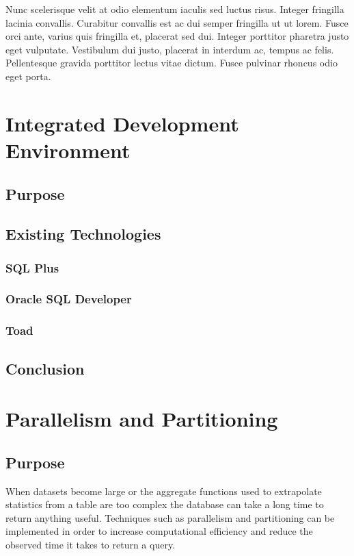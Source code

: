 \documentclass[draftclsnofoot, onecolumn, compsoc, 10pt]{IEEEtran}
\begin{document}
Nunc scelerisque velit at odio elementum iaculis sed luctus risus. Integer fringilla lacinia convallis. Curabitur convallis est ac dui semper fringilla ut ut lorem. Fusce orci ante, varius quis fringilla et, placerat sed dui. Integer porttitor pharetra justo eget vulputate. Vestibulum dui justo, placerat in interdum ac, tempus ac felis. Pellentesque gravida porttitor lectus vitae dictum. Fusce pulvinar rhoncus odio eget porta.

\section{Integrated Development Environment}

\subsection{Purpose}

\subsection{Existing Technologies}

\subsubsection{SQL Plus}

\subsubsection{Oracle SQL Developer}

\subsubsection{Toad}

\subsection{Conclusion}

\section{Parallelism and Partitioning}

\subsection{Purpose}
When datasets become large or the aggregate functions used to extrapolate statistics from a table are too complex the database can take a long time to return anything useful.
Techniques such as parallelism and partitioning can be implemented in order to increase computational efficiency and reduce the observed time it takes to return a query. 
\end{document}
